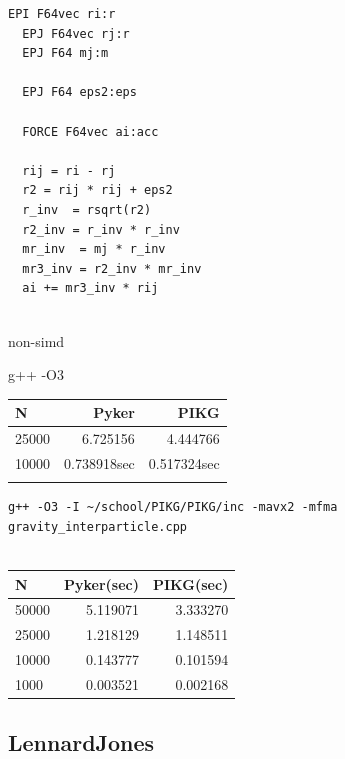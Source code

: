 \documentclass[ams, a4j]{U-AizuGT}
\begin{document}
\begin{lstlisting}[frame=single, caption=Nbody-kernel.pikg, label=Nbody-kernel.pikg]
  EPI F64vec ri:r
  EPJ F64vec rj:r
  EPJ F64 mj:m
  
  EPJ F64 eps2:eps
  
  FORCE F64vec ai:acc
  
  rij = ri - rj
  r2 = rij * rij + eps2
  r_inv  = rsqrt(r2)
  r2_inv = r_inv * r_inv
  mr_inv  = mj * r_inv
  mr3_inv = r2_inv * mr_inv
  ai += mr3_inv * rij
  
\end{lstlisting}




non-simd

g++ -O3 

\begin{tabular}{|l|r|r|} \hline
  N & Pyker & PIKG \\ \hline
  25000 & 6.725156 & 4.444766 \\
  10000 & 0.738918sec & 0.517324sec \\


 \\ \hline
\end{tabular}


\begin{lstlisting}[frame=single, caption=Nbody-kernel.pikg, label=Nbody-kernel.pikg]
  g++ -O3 -I ~/school/PIKG/PIKG/inc -mavx2 -mfma gravity_interparticle.cpp
  
  \end{lstlisting}



  \begin{tabular}{|l|r|r|} \hline
    N & Pyker(sec) & PIKG(sec) \\ \hline
    50000 & 5.119071 & 3.333270\\
    25000 & 1.218129 & 1.148511 \\
    10000 & 0.143777 & 0.101594 \\
    1000 &  0.003521 & 0.002168 \\ \hline
  \end{tabular}
  

\subsection{LennardJones}
\end{document}
